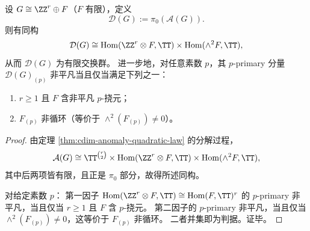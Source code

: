 \begin{proposition}[离散异常账本的显式分解与素因子判据]\label{prop:cdim-discrete-anomaly-ledger}
设 \(G\cong \ZZ^r\oplus F\)（\(F\) 有限），定义
\[
\mathcal D(G):=\pi_0(\mathcal A(G)).
\]
则有同构
\[
\mathcal D(G)\cong
\operatorname{Hom}(\ZZ^r\otimes F,\TT)\times \operatorname{Hom}(\wedge^2F,\TT),
\]
从而 \(\mathcal D(G)\) 为有限交换群。
进一步地，对任意素数 \(p\)，其 \(p\)-primary 分量 \(\mathcal D(G)_{(p)}\) 非平凡当且仅当满足下列之一：
\begin{enumerate}
  \item \(r\ge 1\) 且 \(F\) 含非平凡 \(p\)-挠元；
  \item \(F_{(p)}\) 非循环（等价于 \(\wedge^2(F_{(p)})\neq 0\)）。
\end{enumerate}
\end{proposition}
\begin{proof}
由定理 \ref{thm:cdim-anomaly-quadratic-law} 的分解过程，
\[
\mathcal A(G)\cong
\TT^{\binom r2}
\times\operatorname{Hom}(\ZZ^r\otimes F,\TT)
\times\operatorname{Hom}(\wedge^2F,\TT),
\]
其中后两项皆有限，且正是 \(\pi_0\) 部分，故得所述同构。

对给定素数 \(p\)：
第一因子 \(\operatorname{Hom}(\ZZ^r\otimes F,\TT)\cong \operatorname{Hom}(F,\TT)^r\) 的 \(p\)-primary 非平凡，当且仅当 \(r\ge 1\) 且 \(F\) 含 \(p\)-挠元。
第二因子的 \(p\)-primary 非平凡，当且仅当 \(\wedge^2(F_{(p)})\neq 0\)，这等价于 \(F_{(p)}\) 非循环。
二者并集即为判据。证毕。
\end{proof}

